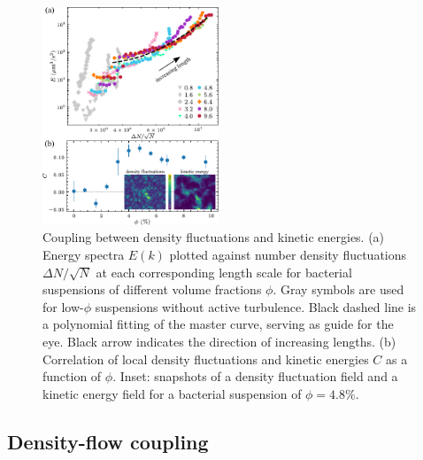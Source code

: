 \documentclass[twocolumn,aps,prx,amsmath,amssymb,longbibliography]{revtex4-2}
\begin{document}
\begin{figure}[t]
\begin{center}
\includegraphics[width=0.47\textwidth]{figures/GNF-energy-spectra-correlation/v6.pdf}
\caption[The correlation between GNF and kinetic energy and kinetic energy spectra.]
{
Coupling between density fluctuations and kinetic energies.
(a) Energy spectra $E(k)$ plotted against number density fluctuations $\Delta N/\sqrt N$ at each corresponding length scale for bacterial suspensions of different volume fractions $\phi$. Gray symbols are used for low-$\phi$ suspensions without active turbulence. Black dashed line is a polynomial fitting of the master curve, serving as guide for the eye. Black arrow indicates the direction of increasing lengths.
(b) Correlation of local density fluctuations and kinetic energies $C$ as a function of $\phi$. Inset: snapshots of a density fluctuation field and a kinetic energy field for a bacterial suspension of $\phi = 4.8\%$.
}
\label{fig:GNF-energy-spectra-correlation}
\end{center}
\end{figure}

\subsection{Density-flow coupling} \label{Density-flow coupling}
\end{document}
